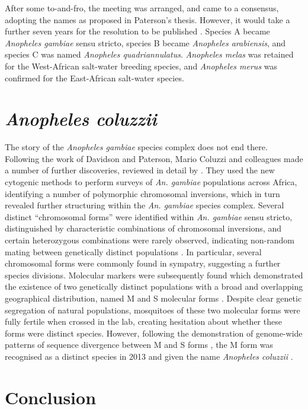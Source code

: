 \documentclass[a4paper,11pt,abstracton,hidelinks]{scrartcl}
\begin{document}
After some to-and-fro, the meeting was arranged, and came to a consensus, adopting the names as proposed in Paterson's thesis. However, it would take a further seven years for the resolution to be published \citep{Mattingly1977}. Species A became \textit{Anopheles gambiae} sensu stricto, species B became \textit{Anopheles arabiensis}, and species C was named \textit{Anopheles quadriannulatus}. \textit{Anopheles melas} was retained for the West-African salt-water breeding species, and \textit{Anopheles merus} was confirmed for the East-African salt-water species.


\section{\textit{Anopheles coluzzii}}


The story of the \textit{Anopheles gambiae} species complex does not end there. 
Following the work of Davidson and Paterson, Mario Coluzzi and colleagues made a number of further discoveries, reviewed in detail by \citet{Powell2014}. 
They used the new cytogenic methods to perform surveys of \textit{An. gambiae} populations across Africa, identifying a number of polymorphic chromosomal inversions, which in turn revealed further structuring within the \textit{An. gambiae} species complex. 
Several distinct ``chromosomal forms'' were identified within \textit{An. gambiae} sensu stricto, distinguished by characteristic combinations of chromosomal inversions, and certain heterozygous combinations were rarely observed, indicating non-random mating between genetically distinct populations \citep{Toure1998,Coluzzi2002}. 
In particular, several chromosomal forms were commonly found in sympatry, suggesting a further species divisions. 
Molecular markers were subsequently found which demonstrated the existence of two genetically distinct populations with a broad and overlapping geographical distribution, named M and S molecular forms \citep{dellaTorre2001}. 
Despite clear genetic segregation of natural populations, mosquitoes of these two molecular forms were fully fertile when crossed in the lab, creating hesitation about whether these forms were distinct species. 
However, following the  demonstration of genome-wide patterns of sequence divergence between M and S forms \citep{Lawniczak2010}, the M form was recognised as a distinct species in 2013 and given the name \textit{Anopheles coluzzii} \citep{Coetzee2013}. 


\section{Conclusion}
\end{document}
